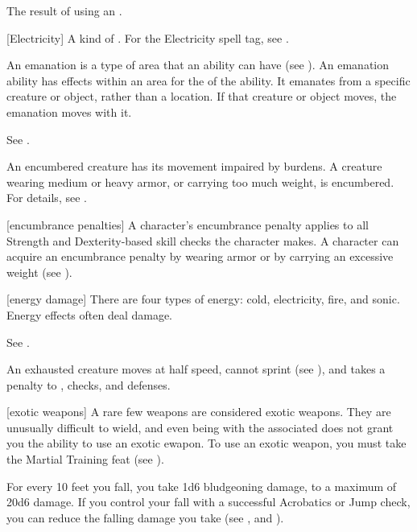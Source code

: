  The result of using an .

[Electricity] A kind of . For the Electricity spell tag, see .

 An emanation is a type of area that an ability can have (see ).
An emanation ability has effects within an area for the  of the ability.
It emanates from a specific creature or object, rather than a location.
If that creature or object moves, the emanation moves with it.

 See .

 An encumbered creature has its movement impaired by burdens.
A creature wearing medium or heavy armor, or carrying too much weight, is encumbered.
For details, see .

[encumbrance penalties] A character's encumbrance penalty applies to all Strength and Dexterity-based skill checks the character makes.
A character can acquire an encumbrance penalty by wearing armor or by carrying an excessive weight (see ).

[energy damage] There are four types of energy: cold, electricity, fire, and sonic. Energy effects often deal damage.


 See .

 An exhausted creature moves at half speed, cannot sprint (see ), and takes a  penalty to , checks, and defenses.

[exotic weapons] A rare few weapons are considered exotic weapons.
They are unusually difficult to wield, and even being  with the associated  does not grant you the ability to use an exotic ewapon.
To use an exotic weapon, you must take the Martial Training feat (see ).

 For every 10 feet you fall, you take 1d6 bludgeoning damage, to a maximum of 20d6 damage.
If you control your fall with a successful Acrobatics or Jump check, you can reduce the falling damage you take (see , and ).

